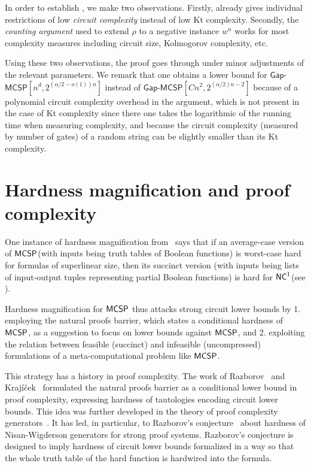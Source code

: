 \documentclass{toc}
\newcommand{\NC}{\ensuremath{{\sf NC}^1}\xspace}
\newcommand{\MCSP}{\ensuremath{{\sf MCSP}}\xspace}
\newcommand{\gapmcsp}{\mathsf{Gap}$-$\mathsf{MCSP}}
\begin{document}
In order to establish , we make two observations. Firstly,  already gives individual restrictions of low \emph{circuit complexity} instead of low Kt complexity. Secondly, the \emph{counting argument} used to extend $\rho$ to a negative instance $w^n$ works for most complexity measures including circuit size, Kolmogorov complexity, etc. 

Using these two observations, the proof goes through under minor adjustments of the relevant parameters. We remark that one obtains a lower bound for $\gapmcsp[n^d, 2^{(\alpha/2 - o(1))n}]$ instead of $\gapmcsp[Cn^2, 2^{(\alpha/2) n - 2}]$ because of a polynomial circuit complexity overhead in the argument, which is not present in the case of Kt complexity since there one takes the logarithmic of the running time when measuring complexity, and because the circuit complexity (measured by number of gates) of a random string can be slightly smaller than its Kt complexity.



\section{Hardness magnification and proof complexity}\label{s:proof_complexity}


One instance of hardness magnification  
from~\cite{OS18} says that if an average-case version of \MCSP (with inputs being truth tables of Boolean functions) is worst-case hard for formulas of superlinear size, then its succinct version (with inputs being lists of input-output tuples representing partial Boolean functions) is hard for \NC (see \cite[Theorem 1]{OS18}). 

Hardness magnification for \MCSP thus attacks strong circuit lower bounds by 1. employing the natural proofs barrier, which states a conditional hardness of \MCSP, as a suggestion to focus on lower bounds against \MCSP, and 2. exploiting the relation %
between feasible (succinct) and infeasible (uncompressed) formulations of a meta-computational problem like \MCSP.

This strategy has a history in proof complexity. The work of Razborov~\cite{Rdisj, Rba} and Kraj\'{i}\v{c}ek~\cite{Kdphp} formulated the natural proofs barrier as a
%
conditional lower bound in proof complexity,
expressing hardness of tautologies encoding circuit lower bounds. This idea was further developed in the theory of proof complexity generators~\cite{Kwphp, ABRW}. It has led, in particular, to Razborov's conjecture~\cite{Rkdnf} about hardness of Nisan-Wigderson generators for strong proof systems. Razborov's conjecture is designed to imply hardness of circuit lower bounds formalized in a way so that the whole truth table of the hard function is hardwired into the formula.
\end{document}
